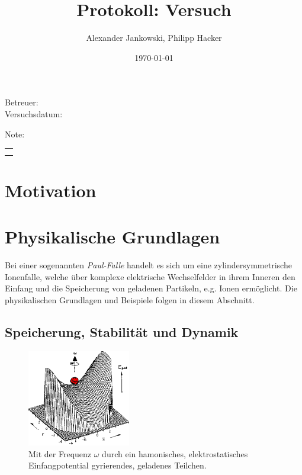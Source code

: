 \documentclass[numbers=noenddot,a4paper,notitlepage,twoside,BCOR15mm]{scrartcl}
\title{Protokoll: Versuch} %
\author{Alexander Jankowski, Philipp Hacker}
\date{\today}
\newcommand{\tilt}[1]{\textit{#1}}
\begin{document}
	\maketitle
	\begin{center}
		Betreuer: \\ %
		Versuchsdatum: \\ %
		\begin{table}[h]
			\centering
			Note: %
			\begin{tabularx}{1.5cm}{|X|}
				\hline \\ \\
				\hline
			\end{tabularx}
		\end{table}
	\end{center}
	\vspace*{\fill}
	\tableofcontents
	\vfill
	\newpage
	\section{Motivation}
	
	\newpage
	\section{Physikalische Grundlagen}

		Bei einer sogenannten \tilt{Paul-Falle} handelt es sich um eine zylindersymmetrische Ionenfalle, welche über komplexe elektrische Wechselfelder in ihrem Inneren den Einfang und die Speicherung von geladenen Partikeln, e.g. Ionen ermöglicht. Die physikalischen Grundlagen und Beispiele folgen in diesem Abschnitt.

		\subsection{Speicherung, Stabilität und Dynamik}

				\begin{figure}
					\centering
					\vspace{-0.5cm}
					\includegraphics[width=0.4\textwidth]{paulpotential.png}
					\caption{Mit der Frequenz $\omega$ durch ein hamonisches, elektrostatisches Einfangpotential gyrierendes, geladenes Teilchen. \cite{UMainzReflektron}}\label{img:potential}
				\end{figure}
\end{document}
